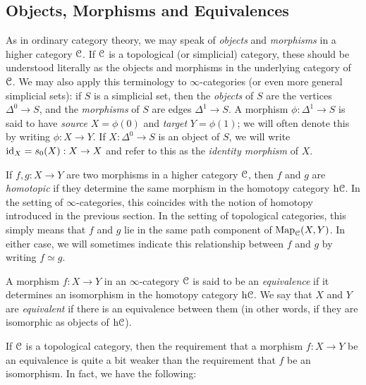 \subsection{Objects, Morphisms and Equivalences}\label{obmor}
\begin{1.2.4 Objects, morphisms, equivalences}

As in ordinary category theory, we may speak of {\it objects} and {\it morphisms} in a higher category $\operatorname{\mathcal{C}}$. If $\operatorname{\mathcal{C}}$ is a topological (or simplicial) category, these
should be understood literally as the objects and morphisms in the
underlying category of $\operatorname{\mathcal{C}}$. We may also apply this terminology
to $\infty$-categories (or even more general simplicial sets): if $S$ is a simplicial set, then the {\it
objects} of $S$ are the vertices $\Delta^0 \rightarrow S$, and the {\it morphisms}
of $S$ are edges $\Delta^1 \rightarrow S$. A morphism $\phi: \Delta^1 \rightarrow S$ is said to have {\it source} $X= \phi(0)$ and {\it target} $Y= \phi(1)$;
we will often denote this by writing $\phi: X \rightarrow Y$.
If $X: \Delta^0 \rightarrow S$ is an object of $S$, we will write
$\operatorname{id}_X = s_0(X): X \rightarrow X$ and refer to this as the {\it identity morphism} of $X$.

If $f,g: X \rightarrow Y$ are two morphisms in a higher category $\operatorname{\mathcal{C}}$, then $f$ and $g$
are {\it homotopic} if they determine the same morphism in the homotopy category $\rm{h} \it{\operatorname{\mathcal{C}}}$. In the setting of $\infty$-categories, this coincides with the notion of homotopy introduced in the previous section. In the setting of
topological categories, this simply means that $f$ and $g$ lie
in the same path component of $\operatorname{{Map}}_{\operatorname{\mathcal{C}}}(X,Y)$. In either case,
we will sometimes indicate this relationship between $f$ and $g$ by writing $f
\simeq g$.

A morphism $f: X \rightarrow Y$ in an $\infty$-category $\operatorname{\mathcal{C}}$ is
said to be an {\it equivalence} if it determines an isomorphism in the homotopy category
$\rm{h} \it{\operatorname{\mathcal{C}}}$. We say that $X$ and $Y$ are {\it equivalent} if there is
an equivalence between them (in other words, if they are
isomorphic as objects of $\rm{h} \it{\operatorname{\mathcal{C}}}$).

If $\operatorname{\mathcal{C}}$ is a topological category, then the
requirement that a morphism $f: X \rightarrow Y$ be an equivalence
is quite a bit weaker than the requirement that $f$ be an
isomorphism. In fact, we have the following:


\end{1.2.4 Objects, morphisms, equivalences}
